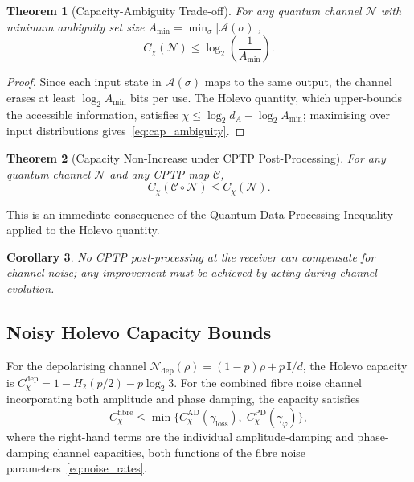 \documentclass[journal,twocolumn]{IEEEtran}
\theoremstyle{definition}
\theoremstyle{plain}
\newtheorem{theorem}{Theorem}[section]
\newtheorem{corollary}[theorem]{Corollary}
\begin{document}
\begin{theorem}[Capacity-Ambiguity Trade-off]
\label{thm:cap_ambiguity}
For any quantum channel $\mathcal{N}$ with minimum ambiguity set
size $A_{\min} = \min_\sigma |\mathcal{A}(\sigma)|$,
\begin{equation}
  C_\chi(\mathcal{N}) \le \log_2\!\left(\frac{1}{A_{\min}}\right).
  \label{eq:cap_ambiguity}
\end{equation}
\end{theorem}

\begin{proof}
Since each input state in $\mathcal{A}(\sigma)$ maps to the same
output, the channel erases at least $\log_2 A_{\min}$ bits per use.
The Holevo quantity, which upper-bounds the accessible information,
satisfies $\chi \le \log_2 d_A - \log_2 A_{\min}$; maximising over
input distributions gives~\eqref{eq:cap_ambiguity}.
\end{proof}

\begin{theorem}[Capacity Non-Increase under CPTP Post-Processing]
\label{thm:capacity_nonincrease}
For any quantum channel $\mathcal{N}$ and any CPTP map
$\mathcal{C}$,
\begin{equation}
  C_\chi(\mathcal{C} \circ \mathcal{N}) \le C_\chi(\mathcal{N}).
  \label{eq:qdpi}
\end{equation}
\end{theorem}

This is an immediate consequence of the Quantum Data Processing
Inequality applied to the Holevo quantity.

\begin{corollary}
No CPTP post-processing at the receiver can compensate for channel
noise; any improvement must be achieved by acting \emph{during}
channel evolution.
\end{corollary}

\subsection{Noisy Holevo Capacity Bounds}

For the depolarising channel $\mathcal{N}_{\mathrm{dep}}(\rho)
= (1-p)\rho + p\,\mathbf{I}/d$, the Holevo capacity is
$C_\chi^{\mathrm{dep}} = 1 - H_2(p/2) - p\log_2 3$.  For the
combined fibre noise channel incorporating both amplitude and phase
damping, the capacity satisfies
\begin{equation}
  C_\chi^{\mathrm{fibre}} \le
  \min\bigl\{C_\chi^{\mathrm{AD}}(\gamma_{\mathrm{loss}}),\;
             C_\chi^{\mathrm{PD}}(\gamma_\varphi)\bigr\},
  \label{eq:fibre_capacity_bound}
\end{equation}
where the right-hand terms are the individual amplitude-damping and
phase-damping channel capacities, both functions of the fibre noise
parameters~\eqref{eq:noise_rates}.
\end{document}
